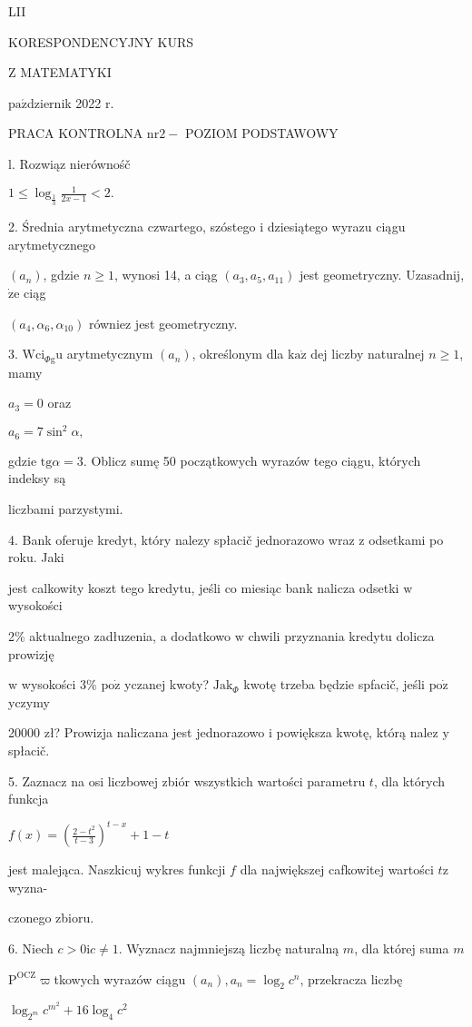 \documentclass[a4paper,12pt]{article}
\begin{document}
LII

KORESPONDENCYJNY KURS

Z MATEMATYKI

$\mathrm{p}\mathrm{a}\acute{\mathrm{z}}$dziernik 2022 $\mathrm{r}.$

PRACA KONTROLNA $\mathrm{n}\mathrm{r} 2-$ POZIOM PODSTAWOWY

l. Rozwiąz nierównośč

$1\displaystyle \leq\log_{\frac{1}{3}}\frac{1}{2x-1}<2.$

2. Średnia arytmetyczna czwartego, szóstego $\mathrm{i}$ dziesiątego wyrazu ciągu arytmetycznego

$(a_{n})$, gdzie $ n\geq 1$, wynosi 14, a ciąg $(a_{3},a_{5},a_{11})$ jest geometryczny. Uzasadnij, $\dot{\mathrm{z}}\mathrm{e}$ ciąg

$(a_{4},\alpha_{6},\alpha_{10})$ równiez jest geometryczny.

3. $\mathrm{W}\mathrm{c}\mathrm{i}_{\Phi \mathrm{g}}\mathrm{u}$ arytmetycznym $(a_{n})$, określonym dla $\mathrm{k}\mathrm{a}\dot{\mathrm{z}}$ dej liczby naturalnej $n\geq 1$, mamy

$a_{3}=0$ oraz

$a_{6}=7\sin^{2}\alpha,$

gdzie $\mathrm{t}\mathrm{g}\alpha=3$. Oblicz sumę 50 początkowych wyrazów tego ciągu, których indeksy są

liczbami parzystymi.

4. Bank oferuje kredyt, który nalezy spłacič jednorazowo wraz $\mathrm{z}$ odsetkami po roku. Jaki

jest calkowity koszt tego kredytu, jeśli co miesiąc bank nalicza odsetki $\mathrm{w}$ wysokości

2\% aktualnego zadłuzenia, a dodatkowo $\mathrm{w}$ chwili przyznania kredytu dolicza prowizję

$\mathrm{w}$ wysokości 3\% $\mathrm{p}\mathrm{o}\dot{\mathrm{z}}$ yczanej kwoty? $\mathrm{J}\mathrm{a}\mathrm{k}_{\Phi}$ kwotę trzeba będzie spfacič, jeśli $\mathrm{p}\mathrm{o}\dot{\mathrm{z}}$ yczymy

20000 zł? Prowizja naliczana jest jednorazowo $\mathrm{i}$ powiększa kwotę, którą nalez $\mathrm{y}$ spłacič.

5. Zaznacz na osi liczbowej zbiór wszystkich wartości parametru $t$, dla których funkcja

$f(x)=(\displaystyle \frac{2-t^{2}}{t-3})^{t-x}+1-t$

jest malejąca. Naszkicuj wykres funkcji $f$ dla największej cafkowitej wartości $t\mathrm{z}$ wyzna-

czonego zbioru.

6. Niech $c > 0 \mathrm{i} c \neq 1$. Wyznacz najmniejszą liczbę naturalną $m$, dla której suma $m$

$\mathrm{P}^{\mathrm{O}\mathrm{C}\mathrm{Z}}\varpi$tkowych wyrazów ciągu $(a_{n}), a_{n}=\log_{2}c^{n}$, przekracza liczbę

$\log_{2^{m}}c^{m^{2}}+16\log_{4}c^{2}$
\end{document}
